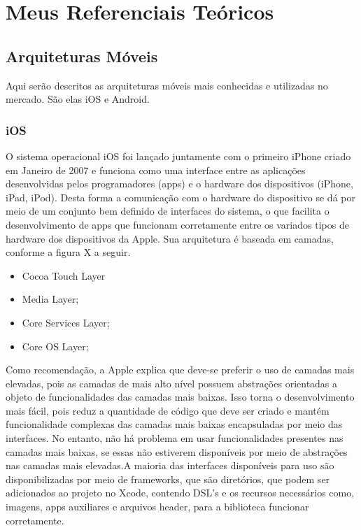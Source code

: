 \part{Meus Referenciais Teóricos}

\chapter[Arquiteturas móveis]{Arquiteturas Móveis}


Aqui serão descritos as arquiteturas móveis mais conhecidas e utilizadas no mercado. São elas iOS e Android.


\section{iOS}

O sistema operacional iOS foi lançado juntamente com o primeiro iPhone criado em Janeiro de 2007 e 
funciona como uma interface entre as aplicações desenvolvidas pelos programadores (apps) e o hardware 
dos dispositivos (iPhone, iPad, iPod). Desta forma a comunicação com o hardware do dispositivo se dá 
por meio de um conjunto bem definido de interfaces do sistema, o que facilita o desenvolvimento de apps 
que funcionam corretamente entre os variados tipos de hardware dos dispositivos da Apple. Sua arquitetura 
é baseada em camadas, conforme a figura X a seguir.

 
\begin{itemize}

	\item Cocoa Touch Layer
	\item Media Layer;
	\item Core Services Layer;
	\item Core OS Layer;

\end{itemize}


Como recomendação, a Apple explica que deve-se preferir o uso de camadas mais elevadas, pois as camadas de 
mais alto nível possuem abstrações orientadas a objeto de funcionalidades das camadas mais baixas. Isso 
torna o desenvolvimento mais fácil, pois reduz a quantidade de código que deve ser criado e mantém funcionalidade 
complexas das camadas mais baixas encapsuladas por meio das interfaces. No entanto, não há problema em usar 
funcionalidades presentes nas camadas mais baixas, se essas não estiverem disponíveis por meio de abstrações nas 
camadas mais elevadas.A maioria das interfaces disponíveis para uso são disponibilizadas por meio de frameworks, 
que são diretórios, que podem ser adicionados ao projeto no Xcode, contendo DSL's e os recursos necessários como, 
imagens, apps auxiliares e arquivos header, para a biblioteca funcionar corretamente.


